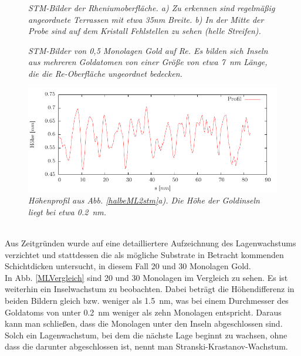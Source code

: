 \begin{figure}[htbp]
	\begin{minipage}[b]{0.5\textwidth} 
		\sffamily
		
	\end{minipage}
	\hfill
	\begin{minipage}[b]{0.5\textwidth}
		\sffamily
		
	\end{minipage}
	\caption{\textit{STM-Bilder der Rheniumoberfläche. a) Zu erkennen sind regelmäßig angeordnete
	Terrassen mit etwa 35nm Breite. b) In der Mitte der Probe sind auf dem Kristall Fehlstellen zu
	sehen (helle Streifen).}}
	\label{rekristallstm} 
	\begin{minipage}[b]{0.5\textwidth} 
		\sffamily
		
	\end{minipage}
	\hfill
	\begin{minipage}[b]{0.5\textwidth}
		\sffamily
		
	\end{minipage}
	\caption{\textit{STM-Bilder von 0,5 Monolagen Gold auf Re. Es bilden sich Inseln aus
	mehreren Goldatomen von einer Größe von etwa \SI{7}{nm} Länge, die die Re-Oberfläche ungeordnet bedecken.}}
	\label{halbeML2stm} 
	\vfill
	\centering
	\includegraphics{pics/profilhalbeML}
	\caption{\textit{Höhenprofil aus Abb. \ref{halbeML2stm}a). Die Höhe der Goldinseln liegt bei etwa
	\SI{0,2}{nm}.}}
	\label{profilhalbeML} 
\end{figure}




\\
Aus Zeitgründen wurde auf eine detailliertere Aufzeichnung des Lagenwachstums
verzichtet und stattdessen die als mögliche Substrate in Betracht kommenden Schichtdicken untersucht, in diesem
Fall 20 und 30 Monolagen Gold.\\
In Abb. \ref{MLVergleich} sind 20 und 30 Monolagen im Vergleich zu sehen. Es ist weiterhin ein
Inselwachstum zu beobachten.  Dabei beträgt die Höhendifferenz in beiden Bildern gleich bzw. weniger
als \SI{1,5}{nm}, was bei einem Durchmesser des Goldatoms von unter \SI{0,2}{nm} weniger als
zehn Monolagen entspricht.
Daraus kann man schließen, dass die Monolagen unter den Inseln abgeschlossen sind. Solch ein Lagenwachstum, bei dem die nächste Lage beginnt zu
wachsen, ohne dass die darunter abgeschlossen ist, nennt man Stranski-Krastanov-Wachstum.


